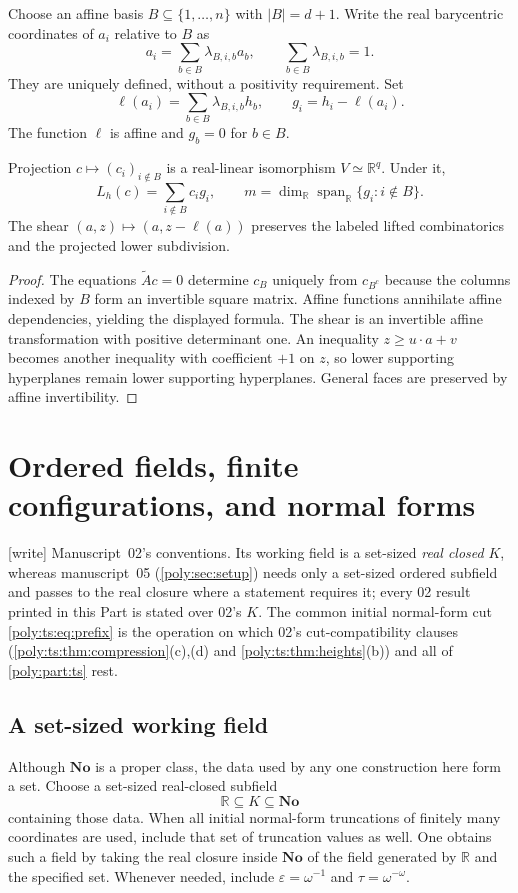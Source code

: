 \documentclass[11pt,a4paper]{article}
\numberwithin{equation}{section}
\theoremstyle{plain}
\newcommand{\wtag}{\textup{[write]}}%
\newcommand{\No}{\mathbf{No}}
\newcommand{\R}{\mathbb R}
\newcommand{\eps}{\varepsilon}
\newcommand{\Span}{\operatorname{span}_{\R}}%
\newcommand{\Atil}{\widetilde A}
\begin{document}
Choose an affine basis $B\subseteq\{1,\ldots,n\}$ with $|B|=d+1$.
Write the real barycentric coordinates of $a_i$ relative to $B$ as
\[
 a_i=\sum_{b\in B}\lambda_{B,i,b}a_b,
 \qquad \sum_{b\in B}\lambda_{B,i,b}=1.
\]
They are uniquely defined, without a positivity requirement. Set
\begin{equation}\label{poly:eq:gauge}
 \ell(a_i)=\sum_{b\in B}\lambda_{B,i,b}h_b,
 \qquad g_i=h_i-\ell(a_i).
\end{equation}
The function $\ell$ is affine and $g_b=0$ for $b\in B$.

\begin{lemma}\label{poly:lem:gauge}
Projection $c\mapsto(c_i)_{i\notin B}$ is a real-linear isomorphism
$V\simeq\R^q$. Under it,
\[
 L_h(c)=\sum_{i\notin B}c_i g_i,
 \qquad m=\dim_{\R}\Span\{g_i:i\notin B\}.
\]
The shear $(a,z)\mapsto(a,z-\ell(a))$ preserves the labeled lifted
combinatorics and the projected lower subdivision.
\end{lemma}
\begin{proof}
The equations $\Atil c=0$ determine $c_B$ uniquely from $c_{B^c}$ because
the columns indexed by $B$ form an invertible square matrix. Affine
functions annihilate affine dependencies, yielding the displayed formula.
The shear is an invertible affine transformation with positive determinant
one. An inequality $z\ge u\cdot a+v$ becomes another inequality with
coefficient $+1$ on $z$, so lower supporting hyperplanes remain lower
supporting hyperplanes. General faces are preserved by affine invertibility.
\end{proof}

\section{Ordered fields, finite configurations, and normal forms}\label{poly:ts:sec:setup}
\noindent\wtag{} Manuscript~02's conventions. Its working field is a
set-sized \emph{real closed} $K$, whereas manuscript~05
(\cref{poly:sec:setup}) needs only a set-sized ordered subfield and passes to
the real closure where a statement requires it; every 02 result printed in
this Part is stated over 02's $K$. The common initial normal-form cut
\eqref{poly:ts:eq:prefix} is the operation on which 02's cut-compatibility
clauses (\cref{poly:ts:thm:compression}(c),(d) and
\cref{poly:ts:thm:heights}(b)) and all of \cref{poly:part:ts} rest.

\subsection{A set-sized working field}
Although $\No$ is a proper class, the data used by any one construction here
form a set. Choose a set-sized real-closed subfield
\[
 \R\subseteq K\subseteq\No
\]
containing those data. When all initial normal-form truncations of finitely
many coordinates are used, include that set of truncation values as well.
One obtains such a field by taking the real closure inside $\No$ of the
field generated by $\R$ and the specified set. Whenever needed, include
$\eps=\omega^{-1}$ and $\tau=\omega^{-\omega}$.
\end{document}
